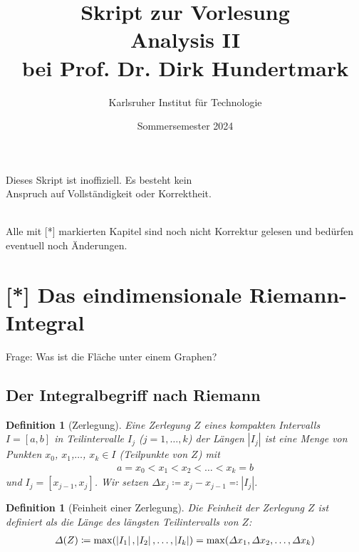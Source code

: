 \documentclass[11pt, twoside, a4paper]{article}
\theoremstyle{plain}
\newtheorem{definition}[blockelement]{Definition}
\numberwithin{equation}{subsection}
\newcommand{\of}[1]{\mathopen{}\mathclose{}\bgroup\left(#1\aftergroup\egroup\right)}
\newcommand{\abs}[1]{\left\lvert#1\right\rvert}
\newcommand{\interv}[1]{\left[#1\right]}
\newcommand{\definedas}[0]{\coloneqq}
\newcommand{\definedasbackwards}[0]{\eqqcolon}
\begin{document}
    \title{\vspace{3cm} Skript zur Vorlesung\\Analysis II\\bei Prof. Dr. Dirk Hundertmark}
    \author{Karlsruher Institut für Technologie}
    \date{Sommersemester 2024}
    \maketitle
    \begin{center}
        Dieses Skript ist inoffiziell. Es besteht kein\\Anspruch auf Vollständigkeit oder Korrektheit.
    \end{center}
    \thispagestyle{empty}
    \newpage

    \tableofcontents
    ~\\
    Alle mit [*] markierten Kapitel sind noch nicht Korrektur gelesen und bedürfen eventuell noch Änderungen.

    \newpage


    \section{[*] Das eindimensionale Riemann-Integral}
    \thispagestyle{pagenumberonly}

    \marginnote{[16. Apr]}
    Frage: Was ist die Fläche unter einem Graphen?


    \subsection{Der Integralbegriff nach Riemann}

    \begin{definition}[Zerlegung]
        Eine Zerlegung $Z$ eines kompakten Intervalls $I=\interv{a,b}$ in Teilintervalle $I_j$ ($j=1,\dots, k$) der Längen $\abs{I_j}$ ist eine Menge von Punkten $x_0$, $x_1$,$\dots$, $x_k\in I$ (Teilpunkte von $Z$) mit
        \begin{align*}
            a=x_0 < x_1 < x_2 < \dots < x_k = b
        \end{align*}
        und $I_j = \interv{x_{j-1}, x_j}$. Wir setzen $\varDelta x_j \definedas x_j - x_{j-1} \definedasbackwards\abs{I_j}$.
    \end{definition}

    \begin{definition}[Feinheit einer Zerlegung]
        Die Feinheit der Zerlegung $Z$ ist definiert als die Länge des längsten Teilintervalls von $Z$:
        \begin{align*}
            \varDelta\of{Z}\definedas \max\of{\abs{I_1}, \abs{I_2}, \dots, \abs{I_k}} = \max\of{\varDelta x_1, \varDelta x_2, \dots, \varDelta x_k}
        \end{align*}
    \end{definition}
\end{document}
